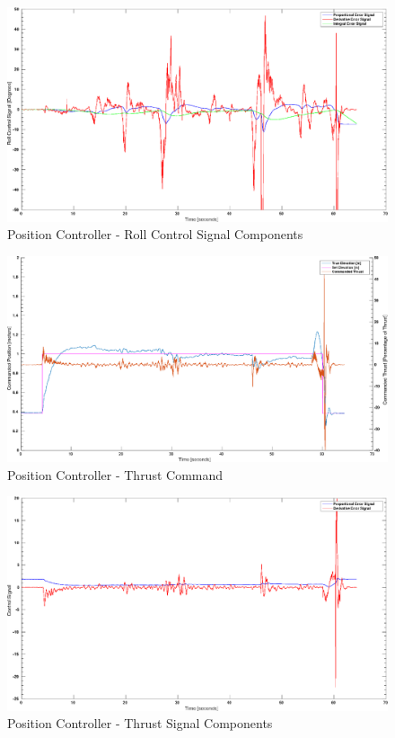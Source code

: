 \documentclass[11pt, twocolumn]{article}
\begin{document}
\begin{figure}
	\centering
	\includegraphics[width=\textwidth]{images/PID_Roll_Controls.eps}
	\caption{Position Controller - Roll Control Signal Components}
	\label{fig:pid_roll}
\end{figure}

\begin{figure}
	\centering
	\includegraphics[width=\textwidth]{images/PID_Elevation_True_and_obs.eps}
	\caption{Position Controller - Thrust Command}
	\label{fig:pid_roll}
\end{figure}

\begin{figure}
	\centering
	\includegraphics[width=\textwidth]{images/PID_Elevation_Controls.eps}
	\caption{Position Controller - Thrust Signal Components}
	\label{fig:pid_roll}
\end{figure}
\end{document}
